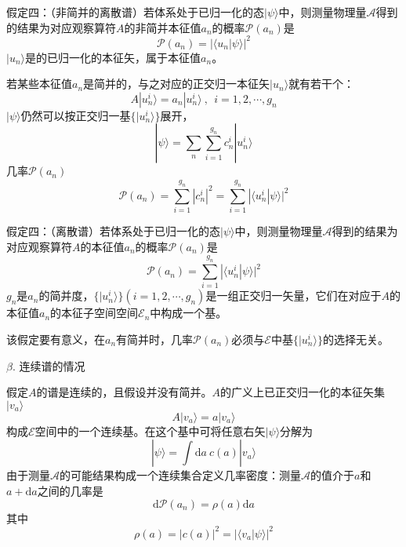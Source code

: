 \documentclass[11pt,a4paper]{article}
\newcommand{\dif}{\mathrm{d}}
\begin{document}
\begin{tcolorbox}[colback=green!15,colframe=green!40!black,title= ]
假定四：（非简并的离散谱）若体系处于已归一化的态$|\psi \rangle$中，则测量物理量$\mathscr{A}$得到的结果为对应观察算符$A$的非简并本征值$a_n$的概率$\mathscr{P}(a_n)$是
\begin{equation*}
\mathscr{P}(a_n) = |\langle u_n|\psi \rangle|^2
\end{equation*}
$|u_n \rangle$是的已归一化的本征矢，属于本征值$a_n$。
\end{tcolorbox}
若某些本征值$a_n$是简并的，与之对应的正交归一本征矢$|u_n \rangle$就有若干个：
\begin{equation}
A|u_n^i \rangle = a_n |u_n^i \rangle ~, ~~ i = 1, 2, \cdots, g_n
\end{equation}
$|\psi \rangle$仍然可以按正交归一基$\{|u_n^i \rangle \}$展开，
\begin{equation}
|\psi \rangle = \sum_n \sum_{i=1}^{g_n} c_n^i |u_n^i \rangle
\end{equation}
几率$\mathscr{P}(a_n)$
\begin{equation}
\mathscr{P}(a_n) = \sum_{i=1}^{g_n} |c_n^i|^2 = \sum_{i=1}^{g_n} |\langle u_n^i |\psi \rangle|^2
\end{equation}
\begin{tcolorbox}[colback=green!15,colframe=green!40!black,title= ]
假定四：（离散谱）若体系处于已归一化的态$|\psi \rangle$中，则测量物理量$\mathscr{A}$得到的结果为对应观察算符$A$的本征值$a_n$的概率$\mathscr{P}(a_n)$是
\begin{equation*}
\mathscr{P}(a_n) = \sum_{i=1}^{g_n} |\langle u_n^i|\psi \rangle|^2
\end{equation*}
$g_n$是$a_n$的简并度，$\{|u^i_n \rangle\} (i = 1, 2, \cdots, g_n)$是一组正交归一矢量，它们在对应于$A$的本征值$a_n$的本征子空间空间$\mathscr{E}_n$中构成一个基。
\end{tcolorbox}
该假定要有意义，在$a_n$有简并时，几率$\mathscr{P}(a_n)$必须与$\mathscr{E}$中基$\{|u_n^i \rangle \}$的选择无关。

$\beta$. 连续谱的情况

假定$A$的谱是连续的，且假设并没有简并。$A$的广义上已正交归一化的本征矢集$|v_a \rangle$
\begin{equation}
A |v_a \rangle = a |v_a \rangle
\end{equation}
构成$\mathscr{E}$空间中的一个连续基。在这个基中可将任意右矢$|\psi \rangle$分解为
\begin{equation}
|\psi \rangle = \int \dif a~ c(a) |v_a \rangle
\end{equation}
由于测量$\mathscr{A}$的可能结果构成一个连续集合定义几率密度：测量$\mathscr{A}$的值介于$a$和$a+\dif a$之间的几率是
\begin{equation*}
\dif \mathscr{P}(a_n) = \rho(a) \dif a
\end{equation*}
其中
\begin{equation*}
\rho(a) = |c(a)|^2 = |\langle v_a | \psi \rangle|^2
\end{equation*}
\end{document}
